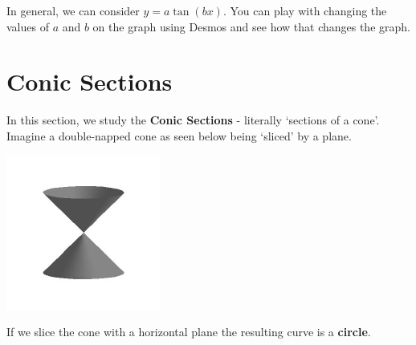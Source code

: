 \documentclass[nooutcomes]{ximera}
\begin{document}
In general, we can consider $y=a\tan(bx)$.  You can play with changing the values of $a$ and $b$ on the graph using Desmos and see how that changes the graph.  

\begin{center}  
\end{center}

\newpage


\section{Conic Sections}
In this section, we study the  \textbf{Conic Sections} - literally `sections of a  cone'.  Imagine a double-napped cone as seen below being `sliced' by a plane. 

\centerline{\includegraphics[width=2in]{./ConicsGraphics/cone.jpg}}

If we slice the cone with a horizontal plane the resulting curve is a  \textbf{circle}.
\end{document}
